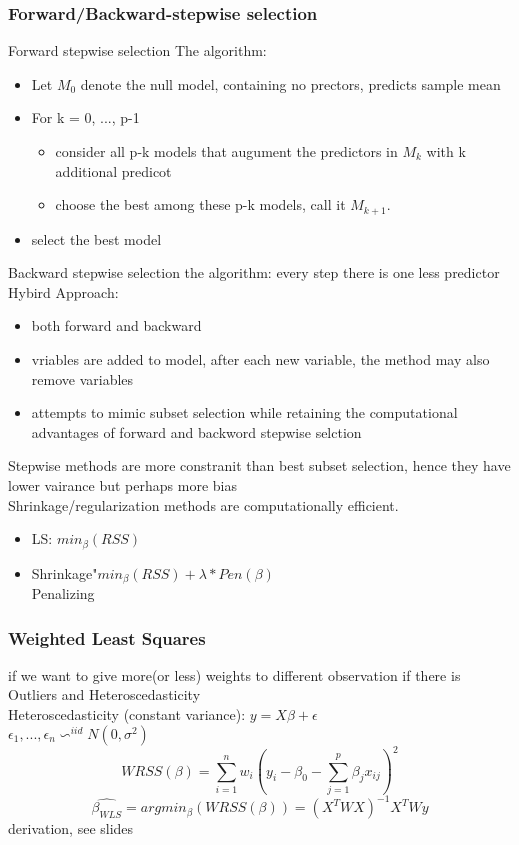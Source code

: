 \documentclass[10pt]{article}
\theoremstyle{break}
\begin{document}
        \subsubsection{Forward/Backward-stepwise selection}
            Forward stepwise selection The algorithm:
            \begin{itemize}
                \item Let $M_0$ denote the null model, containing no prectors, predicts sample mean 
                \item For k = 0, ..., p-1\begin{itemize}
                    \item consider all p-k models  that augument the predictors in $M_k$ with k additional predicot 
                    \item choose the best among these p-k models, call it $M_{k+1}$.
                \end{itemize}
                \item select the best model
            \end{itemize}
            Backward stepwise selection the algorithm: every step there is one less predictor
            \\Hybird Approach: \begin{itemize}
                \item both forward and backward 
                \item vriables are added to model, after each new variable, the method may also remove variables 
                \item attempts to mimic subset selection while retaining the computational advantages of forward and backword stepwise selction
            \end{itemize}
            Stepwise methods are more constranit than best subset selection, hence they have lower vairance but perhaps more bias
            \\Shrinkage/regularization methods are computationally efficient. \begin{itemize}
                \item LS: $min_\beta(RSS)$
                \item Shrinkage"$min_\beta (RSS)+\lambda * Pen(\beta)$
                \\Penalizing
            \end{itemize}
            \subsubsection{Weighted Least Squares}
                if we want to give more(or less) weights to different observation if there is Outliers and Heteroscedasticity
                \\Heteroscedasticity (constant variance): $y=X\beta + \epsilon$  
                \\$\epsilon_1,...,\epsilon_n \backsim^{iid} N(0, \sigma^2)  $
                $$WRSS(\beta) = \sum^n_{i=1}w_i\left(y_i-\beta_0-\sum^p_{j=1}\beta_j x_{ij}\right)^2$$
                $$\hat{\beta_{WLS}} = argmin_\beta(WRSS(\beta)) = (X^TWX)^{-1}X^TWy$$
                derivation, see slides
\end{document}

